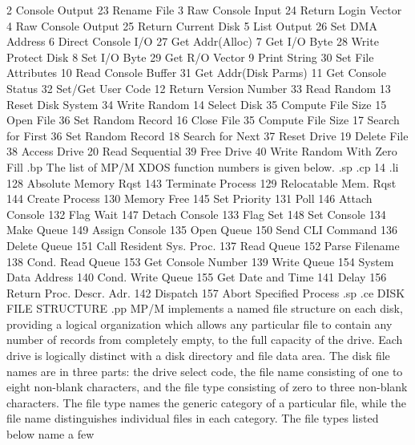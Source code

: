       2  Console Output         23  Rename File
      3  Raw Console Input      24  Return Login Vector
      4  Raw Console Output     25  Return Current Disk
      5  List Output            26  Set DMA Address
      6  Direct Console I/O     27  Get Addr(Alloc)
      7  Get I/O Byte           28  Write Protect Disk
      8  Set I/O Byte           29  Get R/O Vector
      9  Print String           30  Set File Attributes
     10  Read Console Buffer    31  Get Addr(Disk Parms)
     11  Get Console Status     32  Set/Get User Code
     12  Return Version Number  33  Read Random
     13  Reset Disk System      34  Write Random
     14  Select Disk            35  Compute File Size
     15  Open File              36  Set Random Record
     16  Close File             35  Compute File Size
     17  Search for First       36  Set Random Record
     18  Search for Next        37  Reset Drive
     19  Delete File            38  Access Drive
     20  Read Sequential        39  Free Drive
                                40  Write Random With Zero Fill
.bp
The list of MP/M XDOS function numbers is given below.
.sp
.cp 14
.li
    128  Absolute Memory Rqst  143  Terminate Process
    129  Relocatable Mem. Rqst 144  Create Process
    130  Memory Free           145  Set Priority
    131  Poll                  146  Attach Console
    132  Flag Wait             147  Detach Console
    133  Flag Set              148  Set Console
    134  Make Queue            149  Assign Console
    135  Open Queue            150  Send CLI Command
    136  Delete Queue          151  Call Resident Sys. Proc.
    137  Read Queue            152  Parse Filename
    138  Cond. Read Queue      153  Get Console Number
    139  Write Queue           154  System Data Address
    140  Cond. Write Queue     155  Get Date and Time
    141  Delay                 156  Return Proc. Descr. Adr.
    142  Dispatch              157  Abort Specified Process
.sp
.ce
DISK FILE STRUCTURE
.pp
MP/M implements a named file structure on each disk, providing
a logical organization which allows any particular file to
contain any number of records from completely empty, to the
full capacity of the drive.  Each drive is logically distinct
with a disk directory and file data area.  The disk file names
are in three parts:  the drive select code, the file name
consisting of one to eight non-blank characters, and the file
type consisting of zero to three non-blank characters.
The file type names the generic category of a particular
file, while the file name distinguishes individual files
in each category.  The file types listed below name a few
